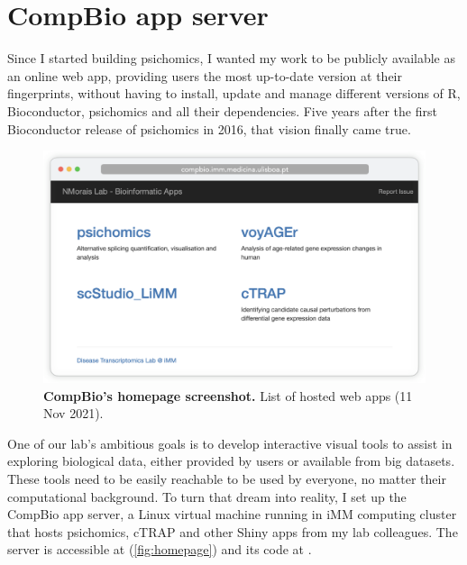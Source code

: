 \chapter{CompBio app server}
\label{chap:app-server}

Since I started building psichomics, I wanted my work to be publicly available as an online web app, providing users the most up-to-date version at their fingerprints, without having to install, update and manage different versions of R, Bioconductor, psichomics and all their dependencies.
Five years after the first Bioconductor release of psichomics in 2016, that vision finally came true.

\begin{figure}[!b]
  \includegraphics[width=.89\textwidth]{images/app-server/homepage}
  \centering
  \caption[Screenshot of CompBio's homepage]{\textbf{CompBio's homepage screenshot.} List of hosted web apps (11 Nov 2021).}
  \label{fig:homepage}
\end{figure}

One of our lab's ambitious goals is to develop interactive visual tools to assist in exploring biological data, either provided by users or available from big datasets. These tools need to be easily reachable to be used by everyone, no matter their computational background. To turn that dream into reality, I set up the CompBio app server, a Linux virtual machine running in iMM computing cluster that hosts psichomics, cTRAP and other Shiny apps from my lab colleagues. The server is accessible at  (\autoref{fig:homepage}) and its code at .

